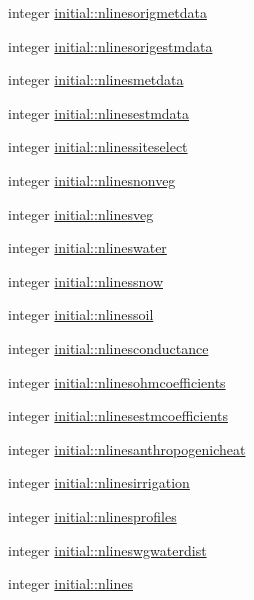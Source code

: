 \begin{DoxyCompactItemize}
integer \hyperlink{namespaceinitial_a6340087c9b63ab9063c64b890941fabd}{initial\+::nlinesorigmetdata}
\item 
integer \hyperlink{namespaceinitial_aa63293cecb7c4a1c022b040f9e01e949}{initial\+::nlinesorigestmdata}
\item 
integer \hyperlink{namespaceinitial_add0284c6ac01e5faf6465d5f7888b82e}{initial\+::nlinesmetdata}
\item 
integer \hyperlink{namespaceinitial_a60bf0e6edcda66939777e00a471d6441}{initial\+::nlinesestmdata}
\item 
integer \hyperlink{namespaceinitial_a3e3aa2dac6195f74548fffbcb36e70a9}{initial\+::nlinessiteselect}
\item 
integer \hyperlink{namespaceinitial_afaaf24e20f8673a6c00a7b282fdccb59}{initial\+::nlinesnonveg}
\item 
integer \hyperlink{namespaceinitial_a40dff61f79d7b5523ba09cd9d74903aa}{initial\+::nlinesveg}
\item 
integer \hyperlink{namespaceinitial_aaea90ff1bd06bb3df87ea523480ef5e3}{initial\+::nlineswater}
\item 
integer \hyperlink{namespaceinitial_ae61ba75b9e7367f983d542386c9f0674}{initial\+::nlinessnow}
\item 
integer \hyperlink{namespaceinitial_acdc8f5cc81a9f02b6b481ef8d4619400}{initial\+::nlinessoil}
\item 
integer \hyperlink{namespaceinitial_ab8823ecdd51c6ba0d2a52a111a1c95f4}{initial\+::nlinesconductance}
\item 
integer \hyperlink{namespaceinitial_a24ff42afc93b609bca01fc9f83884f41}{initial\+::nlinesohmcoefficients}
\item 
integer \hyperlink{namespaceinitial_ab25a9647691a26042f69a1cd4c71dbc5}{initial\+::nlinesestmcoefficients}
\item 
integer \hyperlink{namespaceinitial_a0f40beedf8434899dcbdd965487411c4}{initial\+::nlinesanthropogenicheat}
\item 
integer \hyperlink{namespaceinitial_a06034898c756c3397298055a77d34c08}{initial\+::nlinesirrigation}
\item 
integer \hyperlink{namespaceinitial_a50fc08b99235baf0ef2959b630731ab7}{initial\+::nlinesprofiles}
\item 
integer \hyperlink{namespaceinitial_aa6972faf65c690ae7dcd1d0273db5e5c}{initial\+::nlineswgwaterdist}
\item 
integer \hyperlink{namespaceinitial_a866c6f9bce6417b259081b34ebbd9f4c}{initial\+::nlines}
\item 

\end{DoxyCompactItemize}
